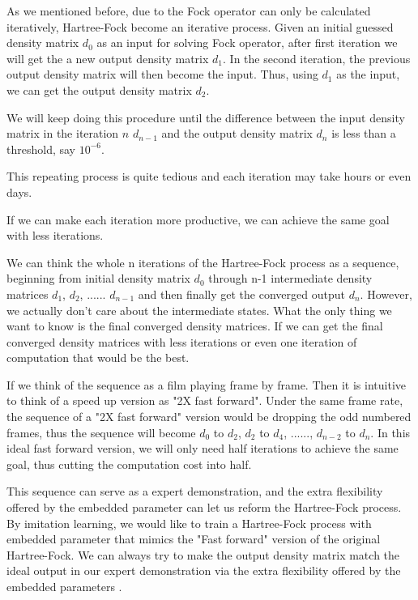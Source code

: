 \documentclass[twoside]{article}
\begin{document}

As we mentioned before,  due to the Fock operator can only be calculated iteratively, Hartree-Fock become an iterative process. Given an initial guessed density matrix $d_0$ as an input for solving Fock operator, after first iteration we will get the a new output density matrix $d_1$. 
In the second iteration, the previous output density matrix will then become the input. Thus, using $d_1$ as the input, we can get the output density matrix $d_2$. 

We will keep doing this procedure until the difference between the input density matrix in the iteration $n$ $d_{n-1}$  and the output density matrix $d_n$ is less than a threshold, say $10^{-6}$. 

This repeating process is quite tedious and each iteration may take hours or even days. %

If we can make each iteration more productive, we can achieve the same goal with less iterations. 

We can think the whole n iterations of the Hartree-Fock process as a sequence, beginning from initial density matrix $d_0$ through n-1 intermediate density matrices $d_1$,  $d_2$,  ...... $d_{n-1}$ and then finally get the converged output $d_{n}$. However, we actually don't care about the intermediate states. What the only thing we want to know is the final converged density matrices. If we can get the final converged density matrices with less iterations or even one iteration of computation that would be the best. 


If we think of the sequence as a film playing frame by frame. Then it is intuitive to think of a speed up version as "2X fast forward". 
Under the same frame rate, the sequence of a  "2X fast forward" version would be dropping the odd numbered frames, thus the sequence will become $d_0$ to $d_2$, $d_2$ to $d_4$, ......, $d_{n-2}$ to $d_n$. In this ideal fast forward version, we will only need half iterations to achieve the same goal, thus cutting the computation cost into half.


This sequence can serve as a expert demonstration, and the extra flexibility offered by the embedded parameter can let us reform the Hartree-Fock process. By imitation learning,
we would like to train a Hartree-Fock process with embedded parameter that  mimics the "Fast forward" version of the original Hartree-Fock. 
We can always try to make the output density matrix match the ideal output in our expert demonstration via the extra flexibility offered by the embedded parameters .
\end{document}
